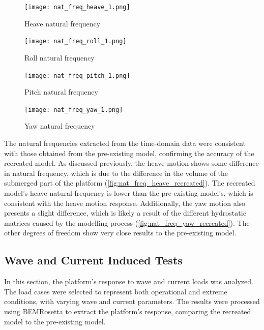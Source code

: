 \documentclass[a4paper, 11pt]{article}
\begin{document}
\begin{figure}[H]
    \begin{minipage}{0.47\textwidth}
        \centering
        \texttt{[image: nat\_freq\_heave\_1.png]}
        \caption{\small Heave natural frequency}
        \label{fig:nat_freq_heave_recreated}
    \end{minipage}
    \hfill
    \begin{minipage}{0.48\textwidth}
        \centering
        \texttt{[image: nat\_freq\_roll\_1.png]}
        \caption{\small Roll natural frequency}
        \label{fig:nat_freq_roll_recreated}
    \end{minipage}
\end{figure}

\begin{figure}[H]
    \begin{minipage}{0.47\textwidth}
        \centering
        \texttt{[image: nat\_freq\_pitch\_1.png]}
        \caption{\small Pitch natural frequency}
        \label{fig:nat_freq_pitch_recreated}
    \end{minipage}
    \hfill
    \begin{minipage}{0.48\textwidth}
        \centering
        \texttt{[image: nat\_freq\_yaw\_1.png]}
        \caption{\small Yaw natural frequency}
        \label{fig:nat_freq_yaw_recreated}
    \end{minipage}
\end{figure}


The natural frequencies extracted from the time-domain data were consistent with those obtained from the pre-existing model, confirming the accuracy of the recreated model. As discussed previously, the heave motion shows some difference in natural frequency, which is due to the difference in the volume of the submerged part of the platform (\autoref{fig:nat_freq_heave_recreated}). The recreated model's heave natural frequency is lower than the pre-existing model's, which is consistent with the heave motion response. Additionally, the yaw motion also presents a slight difference, which is likely a result of the different hydrostatic matrices caused by the modelling process (\autoref{fig:nat_freq_yaw_recreated}). The other degrees of freedom show very close results to the pre-existing model.

\subsection{Wave and Current Induced Tests}
\hspace*{0.5cm}In this section, the platform's response to wave and current loads was analyzed. The load cases were selected to represent both operational and extreme conditions, with varying wave and current parameters. The results were processed using BEMRosetta to extract the platform's response, comparing the recreated model to the pre-existing model.
\end{document}
